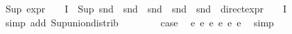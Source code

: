 \begin{isabellebody}
\ {\isacartoucheopen}Sup\ {\isacharparenleft}{\kern0pt}{\isacharparenleft}{\kern0pt}expr{\isacharunderscore}{\kern0pt}{}\ {\isasymcirc}\ {\isasymPhi}{\isacharparenright}{\kern0pt}\ {\isacharbackquote}{\kern0pt}\ I{\isacharparenright}{\kern0pt}\ {\isacharequal}{\kern0pt}\ Sup\ {\isacharparenleft}{\kern0pt}{\isacharparenleft}{\kern0pt}snd\ {\isasymcirc}\ snd\ {\isasymcirc}\ snd\ {\isasymcirc}\ snd\ {\isasymcirc}\ snd\ {\isasymcirc}\ direct{\isacharunderscore}{\kern0pt}expr\ {\isasymcirc}\ {\isasymPhi}{\isacharparenright}{\kern0pt}\ {\isacharbackquote}{\kern0pt}\ I{\isacharparenright}{\kern0pt}{\isacartoucheclose}\isanewline
\ \ \ \ \ \ \isamarkupfalse%
\ {\isacharparenleft}{\kern0pt}simp\ add{\isacharcolon}{\kern0pt}\ Sup{\isacharunderscore}{\kern0pt}union{\isacharunderscore}{\kern0pt}distrib{\isacharparenright}{\kern0pt}\isanewline
\ \ \isamarkupfalse%
\isanewline
\isanewline
\ \ \isamarkupfalse%
\ \isamarkupfalse%
\ {\isacharquery}{\kern0pt}case\ \isamarkupfalse%
\ e{}\ e{}\ e{}\ e{}\ e{}\ e{}\ \isamarkupfalse%
\ simp\isanewline
{}\isamarkupfalse%
\isanewline
%
\endisatagproof
{\isafoldproof}%
%
\isadelimproof
%
\endisadelimproof
%
\isadelimtheory
%
\endisadelimtheory
%
\isatagtheory
%
\endisatagtheory
{\isafoldtheory}%
%
\isadelimtheory
%
\endisadelimtheory
%
\end{isabellebody}%
\endinput
